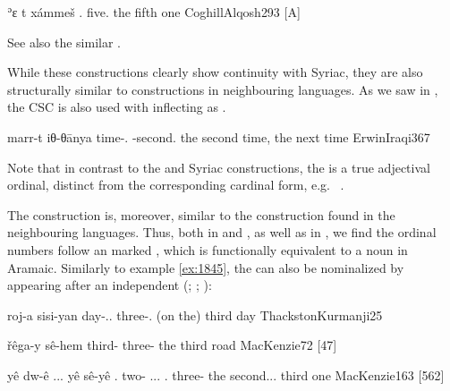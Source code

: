 \newpage 
{}
{ʾɛ\cb{} t\cb{} xámmeš}
{.\fem{} \lnk\cb{} five.\fem}
{the fifth one}
{CoghillAlqosh}{293 {[A]}}


See also the similar \JZax {}.

While these constructions clearly show continuity with Syriac, they are also   structurally similar to constructions in neighbouring languages. As we saw in , the \Iraq CSC is also used with inflecting  as \secns. 

{marr-t iθ-θānya}
{time-\fem.\cst{} -second.\fem}
{the second time, the next time}
{ErwinIraqi}{367}

Note that in contrast to the  and Syriac constructions, the \secn is a true adjectival ordinal, distinct from the corresponding cardinal form, e.g.\   \citep[see][268]{ErwinIraqi}.

The  construction is, moreover, similar to the construction found in the neighbouring  languages. Thus, both in \Kur and \Sor, as well as in \Per, we find the ordinal numbers follow an \ez* marked , which is functionally equivalent to a \cst* noun in Aramaic. Similarly to example \ref{ex:1845}, the  can also be nominalized by appearing after an independent \ez* (; ; ): 

{roj-a sisi-yan}
{day-\ez..\fem{} three-\obl.\pl}
{(on the) third day}
{ThackstonKurmanji}{25}

{řêga-y sê-hem}
{third-\ez{} three-\ord}
{the third road}
{MacKenzie}{72 {[47]}}

{yê dw-ê ... yê sê-yê}
{\ez.\masc{} two-\ord{} ... \ez.\masc{} three-\ord}
{the second... third one}
{MacKenzie}{163 {[562]}}

